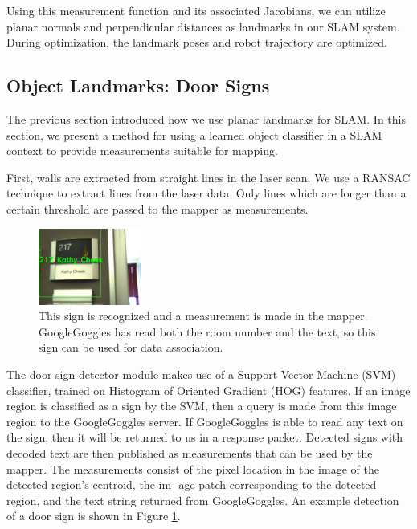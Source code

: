 \documentclass{tADR2e}
\begin{document}
Using this measurement function and its associated Jacobians, we can utilize planar normals and perpendicular distances as landmarks in our SLAM system. During
optimization, the landmark poses and robot trajectory are optimized.

\subsection{Object Landmarks: Door Signs}
\label{sec:door_signs}

The previous section introduced how we use planar landmarks for SLAM. In this section, we present a method for using a learned object classifier in a SLAM context to provide measurements suitable for mapping.

First, walls are extracted from straight lines in the laser scan. We use a
RANSAC technique to extract lines from the laser data. Only lines which are longer than a certain threshold are passed to the mapper as measurements.

\begin{figure}[ht!]
\begin{center}
\centering
\includegraphics[width=0.3\textwidth]{pics/door_sign}
\caption{This sign is recognized and a measurement is made in the mapper. GoogleGoggles has read both the room number and the text, so this sign can be used for
data association.} 
\label{fig:door_sign}
\end{center}
\end{figure}

The door-sign-detector module makes use of a Support Vector Machine (SVM) classifier, trained on Histogram of Oriented
Gradient (HOG) features. If an image region
is classified as a sign by the SVM, then a query is made from this image region to
the GoogleGoggles server. If GoogleGoggles is able to read any text on the sign, then
it will be returned to us in a response packet. Detected signs with decoded text are
then published as measurements that can be used by the mapper. The measurements
consist of the pixel location in the image of the detected region’s centroid, the im-
age patch corresponding to the detected region, and the text string returned from
GoogleGoggles. An example detection of a door sign is shown in Figure \ref{fig:door_sign}.
\end{document}
